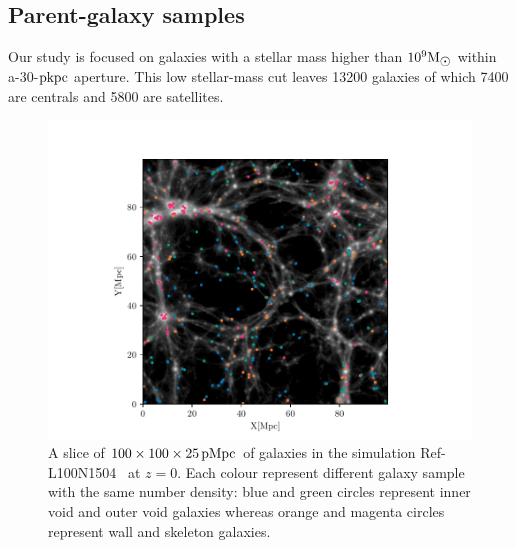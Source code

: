 \documentclass[a4paper,fleqn,usenatbib,letter]{mnras}
\newcommand{\Msun}{\rm M_{\sun}}
\newcommand{\pkpc}{\rm pkpc}
\newcommand{\pMpc}{\rm pMpc}
\newcommand{\REF}{Ref-L100N1504}
\begin{document}
\subsection{Parent-galaxy samples}
\label{subsection:galaxysample}
Our  study is focused on  galaxies with a stellar mass higher than $10^9\Msun$ within 
a-$30$-$\pkpc$  aperture. This low  stellar-mass cut leaves 13200 galaxies of which 7400 are centrals and 5800 are satellites.  
 \begin{figure}	

	\includegraphics[width=2.\columnwidth]{plots_parent_sample/void_image_paper.pdf} 	
    \caption{ A slice of $100\times100\times 25\,\pMpc$  of galaxies in the simulation \REF~ at $z=0$. Each colour represent different galaxy sample with the same number density:  blue and green circles represent inner void and outer void galaxies whereas orange and magenta circles represent wall and skeleton galaxies.}   
     \label{fig:xydiagram}
\end{figure}
\end{document}
